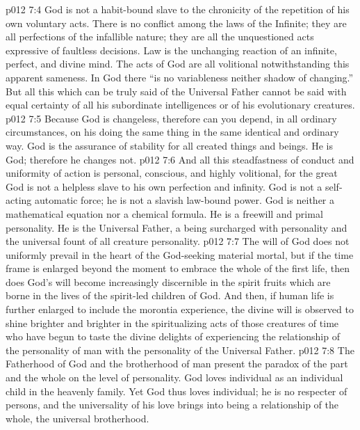 \vs p012 7:4 God is not a habit\hyp{}bound slave to the chronicity of the repetition of his own voluntary acts. There is no conflict among the laws of the Infinite; they are all perfections of the infallible nature; they are all the unquestioned acts expressive of faultless decisions. Law is the unchanging reaction of an infinite, perfect, and divine mind. The acts of God are all volitional notwithstanding this apparent sameness. In God there “is no variableness neither shadow of changing.” But all this which can be truly said of the Universal Father cannot be said with equal certainty of all his subordinate intelligences or of his evolutionary creatures.
\vs p012 7:5 Because God is changeless, therefore can you depend, in all ordinary circumstances, on his doing the same thing in the same identical and ordinary way. God is the assurance of stability for all created things and beings. He is God; therefore he changes not.
\vs p012 7:6 And all this steadfastness of conduct and uniformity of action is personal, conscious, and highly volitional, for the great God is not a helpless slave to his own perfection and infinity. God is not a self\hyp{}acting automatic force; he is not a slavish law\hyp{}bound power. God is neither a mathematical equation nor a chemical formula. He is a freewill and primal personality. He is the Universal Father, a being surcharged with personality and the universal fount of all creature personality.
\pc \vs p012 7:7 The will of God does not uniformly prevail in the heart of the God\hyp{}seeking material mortal, but if the time frame is enlarged beyond the moment to embrace the whole of the first life, then does God’s will become increasingly discernible in the spirit fruits which are borne in the lives of the spirit\hyp{}led children of God. And then, if human life is further enlarged to include the morontia experience, the divine will is observed to shine brighter and brighter in the spiritualizing acts of those creatures of time who have begun to taste the divine delights of experiencing the relationship of the personality of man with the personality of the Universal Father.\plusone
\vs p012 7:8 The Fatherhood of God and the brotherhood of man present the paradox of the part and the whole on the level of personality. God loves  individual as an individual child in the heavenly family. Yet God thus loves  individual; he is no respecter of persons, and the universality of his love brings into being a relationship of the whole, the universal brotherhood.
